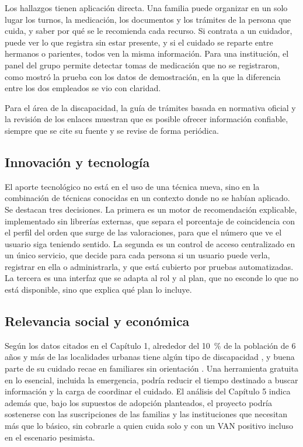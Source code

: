 Los hallazgos tienen aplicación directa. Una familia puede organizar en un solo lugar los turnos, la medicación, los documentos y los trámites de la persona que cuida, y saber por qué se le recomienda cada recurso. Si contrata a un cuidador, puede ver lo que registra sin estar presente, y si el cuidado se reparte entre hermanos o parientes, todos ven la misma información. Para una institución, el panel del grupo permite detectar tomas de medicación que no se registraron, como mostró la prueba con los datos de demostración, en la que la diferencia entre los dos empleados se vio con claridad.

Para el área de la discapacidad, la guía de trámites basada en normativa oficial y la revisión de los enlaces muestran que es posible ofrecer información confiable, siempre que se cite su fuente y se revise de forma periódica.

\subsection{Innovación y tecnología}

El aporte tecnológico no está en el uso de una técnica nueva, sino en la combinación de técnicas conocidas en un contexto donde no se habían aplicado. Se destacan tres decisiones. La primera es un motor de recomendación explicable, implementado sin librerías externas, que separa el porcentaje de coincidencia con el perfil del orden que surge de las valoraciones, para que el número que ve el usuario siga teniendo sentido. La segunda es un control de acceso centralizado en un único servicio, que decide para cada persona si un usuario puede verla, registrar en ella o administrarla, y que está cubierto por pruebas automatizadas. La tercera es una interfaz que se adapta al rol y al plan, que no esconde lo que no está disponible, sino que explica qué plan lo incluye.

\subsection{Relevancia social y económica}

Según los datos citados en el Capítulo 1, alrededor del 10~\% de la población de 6 años y más de las localidades urbanas tiene algún tipo de discapacidad \citep{indec2018}, y buena parte de su cuidado recae en familiares sin orientación \citep{mesacuidados2020}. Una herramienta gratuita en lo esencial, incluida la emergencia, podría reducir el tiempo destinado a buscar información y la carga de coordinar el cuidado. El análisis del Capítulo 5 indica además que, bajo los supuestos de adopción planteados, el proyecto podría sostenerse con las suscripciones de las familias y las instituciones que necesitan más que lo básico, sin cobrarle a quien cuida solo y con un VAN positivo incluso en el escenario pesimista.

